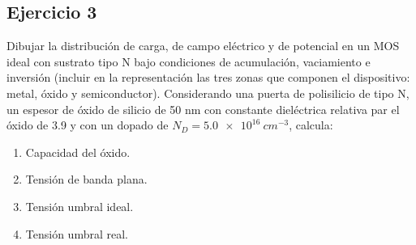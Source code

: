 \begin{Enunciado}
	\subsection*{Ejercicio 3}
	Dibujar la distribución de carga, de campo eléctrico y de potencial en un MOS ideal con sustrato tipo N bajo condiciones de acumulación, vaciamiento e inversión (incluir en la representación las tres zonas que componen el dispositivo: metal, óxido y semiconductor). Considerando una puerta de polisilicio de tipo N, un espesor de óxido de silicio de 50 nm con constante dieléctrica relativa par el óxido de 3.9 y con un dopado de $N_D = \SI{5.0e16}{cm^{-3}}$, calcula:
	\begin{enumerate}[label=\alph*)]
		\item Capacidad del óxido. 
		\item Tensión de banda plana.
		\item Tensión umbral ideal.
		\item Tensión umbral real. 
	\end{enumerate}
\end{Enunciado}

\vspace*{1em}

